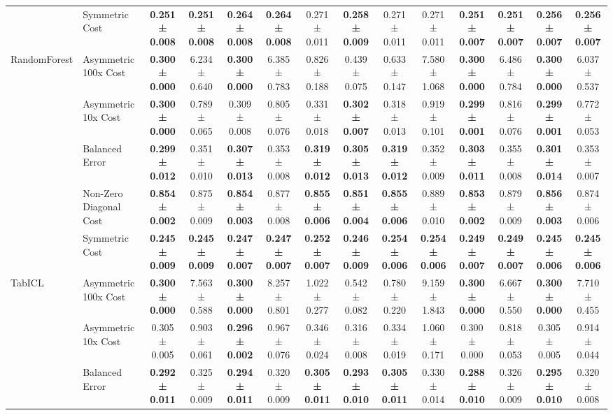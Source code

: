 \begin{table}[H]
{\begin{tabular}{llcccccccccccc}
 & Symmetric Cost & \textbf{0.251 ± 0.008} & \textbf{0.251 ± 0.008} & \textbf{0.264 ± 0.008} & \textbf{0.264 ± 0.008} & 0.271 ± 0.011 & \textbf{0.258 ± 0.009} & 0.271 ± 0.011 & 0.271 ± 0.011 & \textbf{0.251 ± 0.007} & \textbf{0.251 ± 0.007} & \textbf{0.256 ± 0.007} & \textbf{0.256 ± 0.007} \\
\cline{1-14}
\multirow[t]{5}{*}{RandomForest} & Asymmetric 100x Cost & \textbf{0.300 ± 0.000} & 6.234 ± 0.640 & \textbf{0.300 ± 0.000} & 6.385 ± 0.783 & 0.826 ± 0.188 & 0.439 ± 0.075 & 0.633 ± 0.147 & 7.580 ± 1.068 & \textbf{0.300 ± 0.000} & 6.486 ± 0.784 & \textbf{0.300 ± 0.000} & 6.037 ± 0.537 \\
 & Asymmetric 10x Cost & \textbf{0.300 ± 0.000} & 0.789 ± 0.065 & 0.309 ± 0.008 & 0.805 ± 0.076 & 0.331 ± 0.018 & \textbf{0.302 ± 0.007} & 0.318 ± 0.013 & 0.919 ± 0.101 & \textbf{0.299 ± 0.001} & 0.816 ± 0.076 & \textbf{0.299 ± 0.001} & 0.772 ± 0.053 \\
 & Balanced Error & \textbf{0.299 ± 0.012} & 0.351 ± 0.010 & \textbf{0.307 ± 0.013} & 0.353 ± 0.008 & \textbf{0.319 ± 0.012} & \textbf{0.305 ± 0.013} & \textbf{0.319 ± 0.012} & 0.352 ± 0.009 & \textbf{0.303 ± 0.011} & 0.355 ± 0.008 & \textbf{0.301 ± 0.014} & 0.353 ± 0.007 \\
 & Non-Zero Diagonal Cost & \textbf{0.854 ± 0.002} & 0.875 ± 0.009 & \textbf{0.854 ± 0.003} & 0.877 ± 0.008 & \textbf{0.855 ± 0.006} & \textbf{0.851 ± 0.004} & \textbf{0.855 ± 0.006} & 0.889 ± 0.010 & \textbf{0.853 ± 0.002} & 0.879 ± 0.009 & \textbf{0.856 ± 0.003} & 0.874 ± 0.006 \\
 & Symmetric Cost & \textbf{0.245 ± 0.009} & \textbf{0.245 ± 0.009} & \textbf{0.247 ± 0.007} & \textbf{0.247 ± 0.007} & \textbf{0.252 ± 0.007} & \textbf{0.246 ± 0.009} & \textbf{0.254 ± 0.006} & \textbf{0.254 ± 0.006} & \textbf{0.249 ± 0.007} & \textbf{0.249 ± 0.007} & \textbf{0.245 ± 0.006} & \textbf{0.245 ± 0.006} \\
\cline{1-14}
\multirow[t]{5}{*}{TabICL} & Asymmetric 100x Cost & \textbf{0.300 ± 0.000} & 7.563 ± 0.588 & \textbf{0.300 ± 0.000} & 8.257 ± 0.801 & 1.022 ± 0.277 & 0.542 ± 0.082 & 0.780 ± 0.220 & 9.159 ± 1.843 & \textbf{0.300 ± 0.000} & 6.667 ± 0.550 & \textbf{0.300 ± 0.000} & 7.710 ± 0.455 \\
 & Asymmetric 10x Cost & 0.305 ± 0.005 & 0.903 ± 0.061 & \textbf{0.296 ± 0.002} & 0.967 ± 0.076 & 0.346 ± 0.024 & 0.316 ± 0.008 & 0.334 ± 0.019 & 1.060 ± 0.171 & 0.300 ± 0.000 & 0.818 ± 0.053 & 0.305 ± 0.005 & 0.914 ± 0.044 \\
 & Balanced Error & \textbf{0.292 ± 0.011} & 0.325 ± 0.009 & \textbf{0.294 ± 0.011} & 0.320 ± 0.009 & \textbf{0.305 ± 0.011} & \textbf{0.293 ± 0.010} & \textbf{0.305 ± 0.011} & 0.330 ± 0.014 & \textbf{0.288 ± 0.010} & 0.326 ± 0.009 & \textbf{0.295 ± 0.010} & 0.320 ± 0.008 \\

\end{tabular}}
\end{table}
